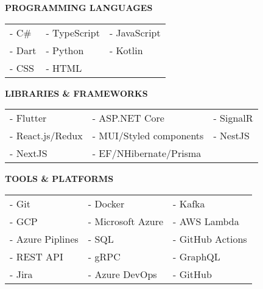 \documentclass[10pt,a4paper,ragged2e]{altacv}
\begin{document}
\divider


\divider


\smallskip

\textcolor{VividPurple}{\textbf{PROGRAMMING LANGUAGES}}
\medskip

\begin{tabular}{ l l l }
	- C\#  & - TypeScript & - JavaScript \\
	- Dart & - Python     & - Kotlin     \\
	- CSS  & - HTML            			 \\
\end{tabular}

\smallskip
\divider

\textcolor{VividPurple}{\textbf{LIBRARIES \& FRAMEWORKS}}
\medskip

\begin{tabular}{ l l l } 
	- Flutter        & - ASP.NET Core          & - SignalR \\
	- React.js/Redux & - MUI/Styled components & - NestJS  \\ 
	- NextJS          & - EF/NHibernate/Prisma					\\
\end{tabular}

\smallskip
\divider

\textcolor{VividPurple}{\textbf{TOOLS \& PLATFORMS}}
\medskip

\begin{tabular}{ l l l }
	- Git            & - Docker          & - Kafka          \\
	- GCP            & - Microsoft Azure & - AWS Lambda     \\
	- Azure Piplines & - SQL             & - GitHub Actions \\
	- REST API       & - gRPC            & - GraphQL        \\
	- Jira           & - Azure DevOps    & - GitHub         \\ 
\end{tabular}
\smallskip
\end{document}
